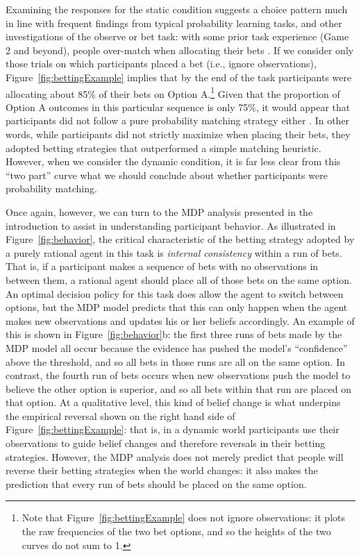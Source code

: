 \documentclass[authoryear]{elsarticle}
\begin{document}
Examining the responses for the static condition suggests a choice pattern much in line with frequent findings from typical probability learning tasks, and other investigations of the observe or bet task: with some prior task experience (Game 2 and beyond), people over-match when allocating their bets \citep[e.g.,][]{shanks_re-examination_2002,rakow_role_2010}. If we consider only those trials on which participants placed a bet (i.e., ignore observations), Figure~\ref{fig:bettingExample} implies that by the end of the task participants were allocating about 85\% of their bets on Option A.\footnote{Note that Figure~\ref{fig:bettingExample} does not ignore observations: it plots the raw frequencies of the two bet options, and so the heights of the two curves do not sum to 1.} Given that the proportion of Option A outcomes in this particular sequence is only 75\%, it would appear that participants did not follow a pure probability matching strategy either \citep[see][for a review]{vulkan_economists_2000}. In other words, while participants did not strictly maximize when placing their bets, they adopted betting strategies that outperformed a simple matching heuristic. However, when we consider the dynamic condition, it is far less clear from this ``two part'' curve what we should conclude about whether participants were probability matching.

Once again, however, we can turn to the MDP analysis presented in the introduction to assist in understanding participant behavior. As illustrated in Figure~\ref{fig:behavior}, the critical characteristic of the betting strategy adopted by a purely rational agent in this task is {\it internal consistency} within a run of bets. That is, if a participant makes a sequence of bets with no observations in between them, a rational agent should place all of those bets on the same option. An optimal decision policy for this task does allow the agent to switch between options, but the MDP model predicts that this can only happen when the agent makes new observations and updates his or her beliefs accordingly. An example of this is shown in Figure~\ref{fig:behavior}b: the first three runs of bets made by the MDP model all occur because the evidence has pushed the model's ``confidence'' above the threshold, and so all bets in those runs are all on the same option. In contrast, the fourth run of bets occurs when new observations push the model to believe the other option is superior, and so all bets within that run are placed on that option. At a qualitative level, this kind of belief change is what underpins the empirical reversal shown on the right hand side of Figure~\ref{fig:bettingExample}: that is, in a dynamic world participants use their observations to guide belief changes and therefore reversals in their betting strategies. However, the MDP analysis does not merely predict that people will reverse their betting strategies when the world changes: it also makes the prediction that every run of bets should be placed on the same option.
\end{document}

